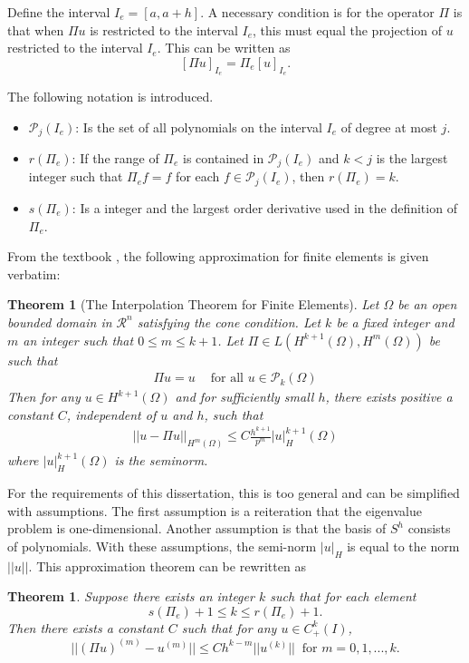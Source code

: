 \documentclass[../../main.tex]{subfiles}
\begin{document}
Define the interval $I_e = [a, a+h]$. A necessary condition is for the operator $\Pi$ is that when $\Pi u$ is restricted to the interval $I_e$, this must equal the projection of $u$ restricted to the interval $I_e$. This can be written as
\begin{equation*}
	\left[ \Pi u \right]_{I_{e}} = \Pi_e [u]_{I_{e}}.
\end{equation*}

The following notation is introduced.
\begin{itemize}
	\item[] $\mathcal{P}_j(I_e)$: Is the set of all polynomials on the interval $I_e$ of degree at most $j$.
	\item[] $r(\Pi_e)$: If the range of $\Pi_e$ is contained in $\mathcal{P}_j(I_e)$ and $k<j$ is the largest integer such that $\Pi_e f = f$ for each $f \in \mathcal{P}_j(I_e)$, then $r(\Pi_e) = k$.
	\item[] $s(\Pi_e)$: Is a integer and the largest order derivative used in the definition of $\Pi_e$.
\end{itemize}

From the textbook \cite{ORXX}, the following approximation for finite elements is given verbatim:
\newtheorem*{Interpolation}{Theorem}
\begin{Interpolation}[The Interpolation Theorem for Finite Elements] 
	Let $\Omega$ be an open bounded domain in $\mathcal{R}^n$ satisfying the cone condition. Let $k$ be a fixed integer and $m$ an integer such that $0\leq m \leq k+1$. Let $\Pi \in L(H^{k+1}(\Omega), H^{m}(\Omega))$ be such that
	\begin{eqnarray}
	    \Pi u = u \ \ \ \ \textrm{ for all } u \in \mathcal{P}_k(\Omega)
	\end{eqnarray}
	Then for any $u \in H^{k+1}(\Omega)$ and for sufficiently small $h$, there exists positive a constant $C$, independent of $u$ and $h$, such that
	\begin{eqnarray}
	    ||u - \Pi u||_{H^m(\Omega)} \leq C \frac{h^{k+1}}{p^m} |u|_H^{k+1}(\Omega)
	\end{eqnarray}
	where $|u|_H^{k+1}(\Omega)$ is the seminorm.
\end{Interpolation}

For the requirements of this dissertation, this is too general and can be simplified with assumptions. The first assumption is a reiteration that the eigenvalue problem is one-dimensional. Another assumption is that the basis of $S^h$ consists of polynomials. With these assumptions, the semi-norm $|u|_H$ is equal to the norm $||u||$. This approximation theorem can be rewritten as
\newtheorem{Interpolation_2}{Theorem}
\begin{Interpolation_2}
	Suppose there exists an integer $k$ such that for each element
	\begin{equation*}
		s(\Pi_e) + 1 \leq k \leq r(\Pi_e) +1.
	\end{equation*}
	Then there exists a constant $C$ such that for any $u \in C^k_+(I)$,
	\begin{equation*}
		||(\Pi u)^(m) - u^(m)|| \leq C h^{k-m} || u^(k)|| \ \text{ for } m = 0,1,...,k.
	\end{equation*}
\end{Interpolation_2}
\end{document}
